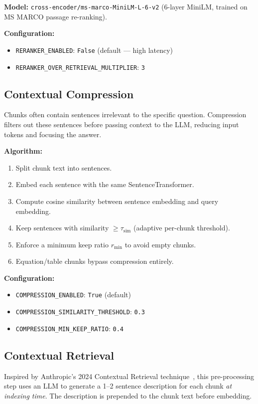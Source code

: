 \documentclass[12pt,a4paper]{article}
\begin{document}
\textbf{Model:} \texttt{cross-encoder/ms-marco-MiniLM-L-6-v2} (6-layer MiniLM, trained on MS MARCO passage re-ranking).

\textbf{Configuration:}
\begin{itemize}
  \item \texttt{RERANKER\_ENABLED}: \texttt{False} (default — high latency)
  \item \texttt{RERANKER\_OVER\_RETRIEVAL\_MULTIPLIER}: \texttt{3}
\end{itemize}

\subsection{Contextual Compression}

Chunks often contain sentences irrelevant to the specific question. Compression filters out these sentences before passing context to the LLM, reducing input tokens and focusing the answer.

\textbf{Algorithm:}
\begin{enumerate}
  \item Split chunk text into sentences.
  \item Embed each sentence with the same SentenceTransformer.
  \item Compute cosine similarity between sentence embedding and query embedding.
  \item Keep sentences with similarity $\geq \tau_{\text{sim}}$ (adaptive per-chunk threshold).
  \item Enforce a minimum keep ratio $r_{\min}$ to avoid empty chunks.
  \item Equation/table chunks bypass compression entirely.
\end{enumerate}

\textbf{Configuration:}
\begin{itemize}
  \item \texttt{COMPRESSION\_ENABLED}: \texttt{True} (default)
  \item \texttt{COMPRESSION\_SIMILARITY\_THRESHOLD}: \texttt{0.3}
  \item \texttt{COMPRESSION\_MIN\_KEEP\_RATIO}: \texttt{0.4}
\end{itemize}

\subsection{Contextual Retrieval}

Inspired by Anthropic's 2024 Contextual Retrieval technique~\cite{anthropic2024contextual}, this pre-processing step uses an LLM to generate a 1--2 sentence description for each chunk \emph{at indexing time}. The description is prepended to the chunk text before embedding.
\end{document}
